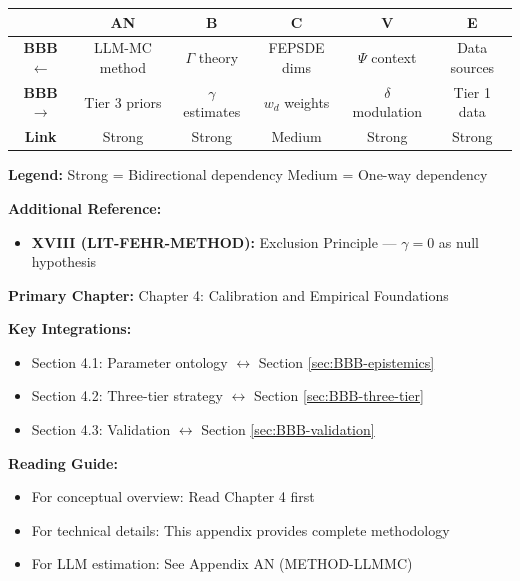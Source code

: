 \begin{tcolorbox}[colback=white, colframe=black,
    title=\textbf{Cross-Reference Map}]

\begin{center}
\small
\begin{tabular}{@{}c|ccccc@{}}
\toprule
& \textbf{AN} & \textbf{B} & \textbf{C} & \textbf{V} & \textbf{E} \\
\midrule
\textbf{BBB $\leftarrow$} & LLM-MC method & $\Gamma$ theory & FEPSDE dims & $\Psi$ context & Data sources \\
\textbf{BBB $\rightarrow$} & Tier 3 priors & $\gamma$ estimates & $w_d$ weights & $\delta$ modulation & Tier 1 data \\
\midrule
\textbf{Link} & \cellcolor{red!20}Strong & \cellcolor{red!20}Strong & \cellcolor{yellow!20}Medium & \cellcolor{red!20}Strong & \cellcolor{red!20}Strong \\
\bottomrule
\end{tabular}
\end{center}

\textbf{Legend:}
\colorbox{red!20}{Strong} = Bidirectional dependency \quad
\colorbox{yellow!20}{Medium} = One-way dependency

\textbf{Additional Reference:}
\begin{itemize}[nosep]
    \item \textbf{XVIII (LIT-FEHR-METHOD):} Exclusion Principle --- $\gamma = 0$ as null hypothesis
\end{itemize}

\end{tcolorbox}


\begin{tcolorbox}[colback=purple!5!white, colframe=purple!75!black,
    title=\textbf{Chapter Linkages}]

\textbf{Primary Chapter:} Chapter 4: Calibration and Empirical Foundations

\textbf{Key Integrations:}
\begin{itemize}[nosep]
    \item Section 4.1: Parameter ontology $\leftrightarrow$ Section \ref{sec:BBB-epistemics}
    \item Section 4.2: Three-tier strategy $\leftrightarrow$ Section \ref{sec:BBB-three-tier}
    \item Section 4.3: Validation $\leftrightarrow$ Section \ref{sec:BBB-validation}
\end{itemize}

\textbf{Reading Guide:}
\begin{itemize}[nosep]
    \item For conceptual overview: Read Chapter 4 first
    \item For technical details: This appendix provides complete methodology
    \item For LLM estimation: See Appendix AN (METHOD-LLMMC)
\end{itemize}

\end{tcolorbox}


